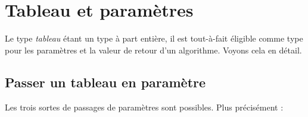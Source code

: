 	\section{Tableau et paramètres}
	
		Le type \emph{tableau} étant un type à part entière,
		il est tout-à-fait éligible comme type
		pour les paramètres et la valeur de retour d'un algorithme.
		Voyons cela en détail.

		\subsection{Passer un tableau en paramètre}
		
			Les trois sortes de passages de paramètres sont possibles.
			Plus précisément :
